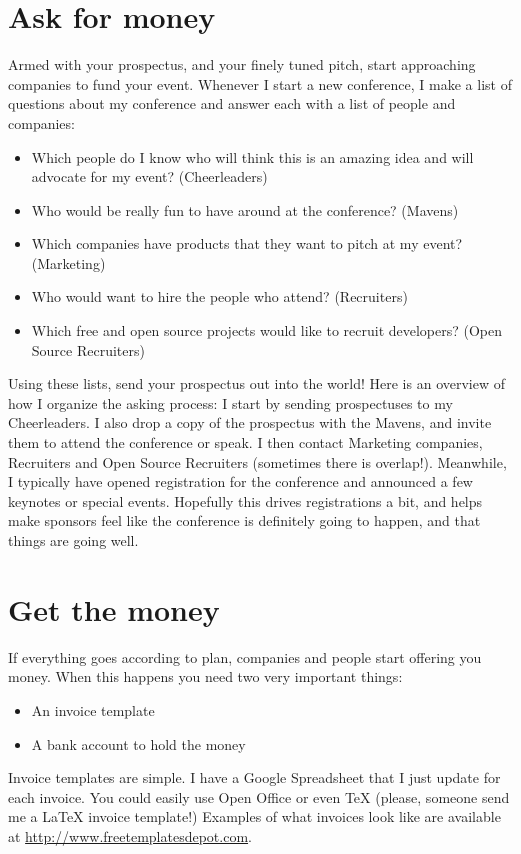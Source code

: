 \section*{Ask for money}
Armed with your prospectus, and your finely tuned pitch, start approaching
companies to fund your event. Whenever I start a new conference, I make a list
of questions about my conference and answer each with a list of people and
companies: 
\begin{itemize}
\item Which people do I know who will think this is an amazing idea and will
advocate for my event? (Cheerleaders)
\item Who would be really fun to have around at the conference? (Mavens)
\item Which companies have products that they want to pitch at my event?
(Marketing)
\item Who would want to hire the people who attend? (Recruiters)
\item Which free and open source projects would like to recruit developers?
(Open Source Recruiters)
\end{itemize}

Using these lists, send your prospectus out into the world! Here is an overview
of how I organize the asking process: 
I start by sending prospectuses to my Cheerleaders. I also drop a copy of the
prospectus with the Mavens, and invite them to attend the conference or speak. I
then contact Marketing companies, Recruiters and Open Source Recruiters
(sometimes there is overlap!).
Meanwhile, I typically have opened registration for the conference and announced
a few keynotes or special events. Hopefully this drives registrations a bit, and
helps make sponsors feel like the conference is definitely going to happen, and
that things are going well.

\section*{Get the money}
If everything goes according to plan, companies and people start offering you
money. When this happens you need two very important things: 
\begin{itemize}
\item An invoice template
\item A bank account to hold the money
\end{itemize}

Invoice templates are simple. I have a Google Spreadsheet that I just update for
each invoice. You could easily use Open Office or even TeX (please, someone send
me a LaTeX invoice template!) Examples of what invoices look like are available
at \url{http://www.freetemplatesdepot.com}.

